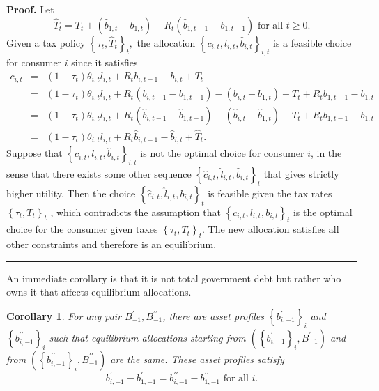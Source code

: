 \documentclass[11.5pt,twoside]{article}
\newtheorem{corollary}{Corollary}
\newenvironment{proof}[1][Proof]{\noindent \textbf{#1.} }{\  \rule{0.5em}{0.5em}}
\begin{document}
\begin{proof}
Let
\begin{equation}
\hat{T}_{t}=T_{t} + \left(\hat{b}_{1,t} - b_{1,t}\right) -
R_{t}\left(\hat{b}_{1,t-1} - b_{1,t-1}\right) \text{ for
all }t\geq 0.  \label{construct That}
\end{equation}%
Given  a tax policy $\left \{ \tau _{t},\hat{T}_{t}\right \} _{t},$ the
allocation $\left \{ c_{i,t},l_{i,t},\hat{b}_{i,t}\right \}_{i,t}$ is a feasible choice for consumer $i$ since it satisfies%
\begin{eqnarray*}
c_{i,t}&=&\left( 1-\tau _{t}\right) \theta _{i,t}l_{i,t}+R_{t}b_{i,t-1}-b_{i,t}+T_{t}\\
&=&\left( 1-\tau _{t}\right) \theta _{i,t}l_{i,t}+R_{t}\left( b_{i,t-1}-b_{1,t-1}\right) -\left(
b_{i,t}-b_{1,t}\right) +T_{t}+R_{t}b_{1,t-1}-b_{1,t} \\
&=&\left( 1-\tau _{t}\right) \theta _{i,t}l_{i,t}+R_{t}\left( \hat{b}_{i,t-1}-\hat{b}_{1,t-1}\right) -\left( \hat{b%
}_{i,t}-\hat{b}_{1,t}\right) +T_{t}+R_{t}b_{1,t-1}-b_{1,t} \\
 &=&\left( 1-\tau _{t}\right) \theta
_{i,t}l_{i,t}+R_{t}\hat{b}_{i,t-1}-\hat{b}_{i,t}+\hat{T}_{t}.
\end{eqnarray*}%
Suppose that $\left \{ c_{i,t},l_{i,t},\hat{b}_{i,t}\right \}_{i,t}$ is not the optimal choice for consumer $i$, in the sense that there exists some
other sequence $\left \{ \hat{c}_{i,t},\hat{l}_{i,t},\hat{b}_{i,t}\right \}_{t}$ that gives strictly higher utility.  Then the choice $%
\left \{ \hat{c}_{i,t},\hat{l}_{i,t},b_{i,t}\right \}_{t}$ is
feasible given the tax rates  $\left \{ \tau _{t},T_{t}\right \} _{t}$%
, which contradicts the assumption that $\left \{ c_{i,t},l_{i,t},b_{i,t}\right \}_{t}$ is the optimal choice for
the consumer given taxes $\left \{ \tau _{t},T_{t}\right \}
_{t}$. The new allocation satisfies all other constraints and
therefore is an equilibrium.
\end{proof}

\smallskip An immediate corollary is  that it is not
total government debt but rather who owns it that affects equilibrium
allocations.

\begin{corollary}
\label{corr: B does not matter} For any pair $B_{-1}^{\prime },B_{-1}^{\prime
\prime }$, there are asset profiles $\left\{ b_{i,-1}^{\prime }\right\} _{i}$ and $%
\left\{ b_{i,-1}^{\prime \prime }\right\} _{i}$ such that
equilibrium allocations starting from  $\left( \left\{ b_{i,-1}^{\prime }\right\}
_{i},B_{-1}^{\prime }\right) $ and  from  $\left( \left\{ b_{i,-1}^{\prime
\prime }\right\} _{i},B_{-1}^{\prime \prime }\right) $ are the same.
These asset profiles satisfy%
\begin{equation*}
b_{i,-1}^{\prime }-b_{1,-1}^{\prime }=b_{i,-1}^{\prime \prime
}-b_{1,-1}^{\prime \prime }\text{ for all }i.
\end{equation*}
\end{corollary}
%
\end{document}
